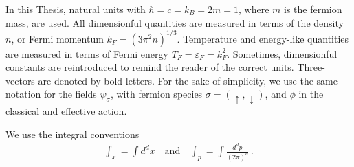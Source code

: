 In this Thesis, natural units with $\hbar = c = k_B = 2m = 1$, where $m$ is the fermion mass, are used. All dimensionful quantities are measured in terms of the density $n$, or Fermi momentum $k_F=(3\pi^2n)^{1/3}$. Temperature and energy-like quantities are measured in terms of Fermi energy $T_F=\varepsilon_F=k_F^2$. Sometimes, dimensionful constants are reintroduced to remind the reader of the correct units. Three-vectors are denoted by bold letters. For the sake of simplicity, we use the same notation for the fields $\psi_{\sigma}$, with fermion species $\sigma=(\uparrow,\downarrow)$, and $\phi$ in the classical and effective action.

We use the integral conventions
\begin{align}
	\int_x = \int d^dx \quad \mathrm{and} \quad  \int_p = \int \frac{d^dp}{(2\pi)^d} \,.
\end{align}
